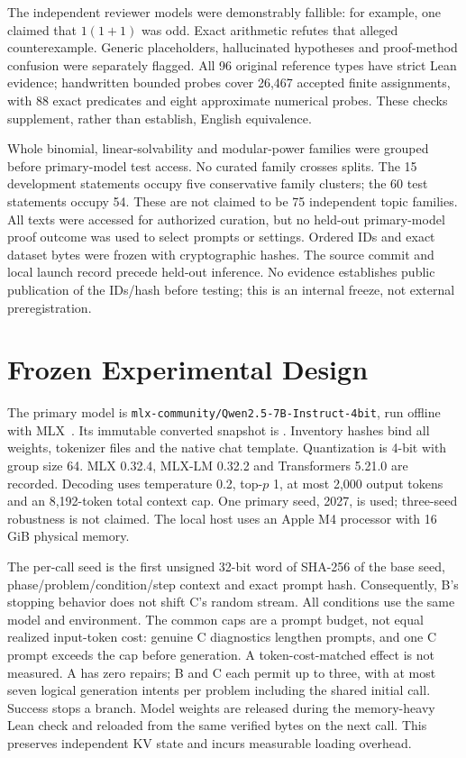 \documentclass[runningheads,a4paper]{llncs}
\begin{document}
The independent reviewer models were demonstrably fallible: for example, one
claimed that $1(1+1)$ was odd. Exact arithmetic refutes that alleged
counterexample. Generic placeholders, hallucinated hypotheses and proof-method
confusion were separately flagged. All 96 original reference types have strict
Lean evidence; handwritten bounded probes cover 26,467 accepted finite
assignments, with 88 exact predicates and eight approximate numerical probes.
These checks supplement, rather than establish, English equivalence.

Whole binomial, linear-solvability and modular-power families were grouped before
primary-model test access. No curated family crosses splits. The 15 development
statements occupy five conservative family clusters; the 60 test statements
occupy 54. These are not claimed to be 75 independent topic families.
All texts were accessed for authorized curation, but no held-out primary-model
proof outcome was used to select prompts or settings. Ordered IDs and exact
dataset bytes were frozen with cryptographic hashes. The source commit and local
launch record precede held-out inference. No evidence establishes public publication
of the IDs/hash before testing; this is an internal freeze, not external preregistration.

\section{Frozen Experimental Design}
The primary model is \texttt{mlx-community/Qwen2.5-7B-Instruct-4bit}, run
offline with MLX~\cite{qwenmlx,mlxlm}. Its immutable converted snapshot is
. Inventory hashes bind all weights, tokenizer files and
the native chat template. Quantization is 4-bit with group size 64. MLX 0.32.4,
MLX-LM 0.32.2 and Transformers 5.21.0 are recorded. Decoding uses temperature
0.2, top-$p$ 1, at most 2,000 output tokens and an 8,192-token total context cap.
One primary seed, 2027, is used; three-seed robustness is not claimed.
The local host uses an Apple M4 processor with 16 GiB physical memory.

The per-call seed is the first unsigned 32-bit word of SHA-256 of the base
seed, phase/problem/condition/step context and exact prompt hash. Consequently,
B's stopping behavior does not shift C's random stream. All conditions use
the same model and environment. The common caps are a prompt budget, not equal
realized input-token cost: genuine C diagnostics lengthen prompts, and one C
prompt exceeds the cap before generation. A token-cost-matched effect is not measured. A has zero repairs; B and C each permit up to
three, with at most seven logical generation intents per problem including the shared
initial call. Success stops a branch. Model weights are released during the
memory-heavy Lean check and reloaded from the same verified bytes on the next
call. This preserves independent KV state and incurs measurable loading overhead.
\end{document}
